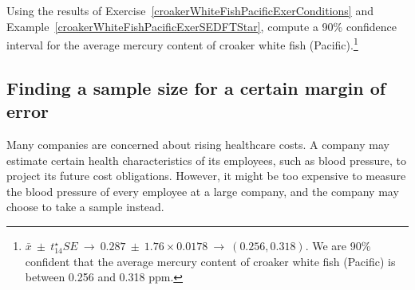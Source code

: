 \begin{exercise}
Using the results of Exercise~\ref{croakerWhiteFishPacificExerConditions} and Example~\ref{croakerWhiteFishPacificExerSEDFTStar}, compute a 90\% confidence interval for the average mercury content of croaker white fish (Pacific).\footnote{$\bar{x} \ \pm\ t^{\star}_{14} SE \ \to\  0.287 \ \pm\  1.76\times 0.0178\ \to\ (0.256, 0.318)$. We are 90\% confident that the average mercury content of croaker white fish (Pacific) is between 0.256 and 0.318 ppm.}


\end{exercise}

\subsection{Finding a sample size for a certain margin of error}
\label{findingASampleSizeForACertainME}


Many companies are concerned about rising healthcare costs. A company may estimate certain health characteristics of its employees, such as blood pressure, to project its future cost obligations. However, it might be too expensive to measure the blood pressure of every employee at a large company, and the company may choose to take a sample instead.

